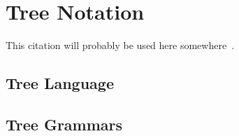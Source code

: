 \section{Tree Notation} \label{sec:tree_notation}

This citation will probably be used here somewhere~\cite{yunits2017tree}.

\iffalse
Intro paragraph describing tree notation in a nutshell
Maybe the whole white paper in one paragraph or two
\fi

\subsection{Tree Language}

\subsection{Tree Grammars}

